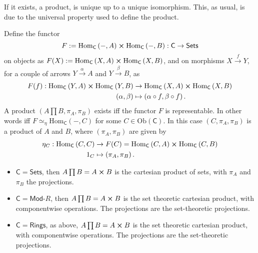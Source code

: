 \begin{rem}
	If it exists, a product, is unique up to a unique isomorphism.
	This, as usual, is due to the universal property used to define the product.
\end{rem}

\begin{prop}
	Define the functor 
	\begin{equation}
	F := \mathrm{Hom}_{\mathsf{C}} \left( -, A \right) \cross \mathrm{Hom}_{\mathsf{C}} \left( -, B \right): \mathsf{C} \to \mathsf{Sets}
	\end{equation} 
	on objects as $F(X) := \mathrm{Hom}_{\mathsf{C}} \left( X, A \right) \cross \mathrm{Hom}_{\mathsf{C}} \left( X, B \right)$, and on morphisms $X \xrightarrow{f} Y$, for a couple of arrows $Y \xrightarrow{\alpha} A$ and $Y \xrightarrow{\beta} B$, as
	\begin{align}
		F(f): \mathrm{Hom}_{\mathsf{C}} \left( Y, A \right) \cross \mathrm{Hom}_{\mathsf{C}} \left( Y, B \right) &\to \mathrm{Hom}_{\mathsf{C}} \left( X, A \right) \cross \mathrm{Hom}_{\mathsf{C}} \left( X, B \right) \\
		\left(\alpha, \beta\right) &\mapsto \left(\alpha \circ f, \beta \circ f \right)
	.\end{align} 
	A product $\left(A \prod B, \pi_A, \pi_B \right)$ exists iff the functor $F$ is representable.
	In other words iff $F \simeq_\eta \mathrm{Hom}_{\mathsf{C}} \left( -, C \right)$ for some $C \in \mathrm{Ob} \left(\mathsf{C}\right)$.
	In this case $\left(C, \pi_A, \pi_B\right)$ is a product of $A$ and $B$, where $\left(\pi_A, \pi_B\right)$ are given by
	\begin{align}
		\eta_C: \mathrm{Hom}_{\mathsf{C}} \left( C, C \right) &\to F(C) = \mathrm{Hom}_{\mathsf{C}} \left( C, A \right) \cross \mathrm{Hom}_{\mathsf{C}} \left( C, B \right)  \\
		1_C &\mapsto \left(\pi_A, \pi_B\right)
	.\end{align} 
\end{prop} 

\begin{ex}\leavevmode\vspace{-.2\baselineskip}
	\begin{itemize}
		\item $\mathsf{C} = \mathsf{Sets}$, then $A \prod B = A \cross B$ is the cartesian product of sets, with $\pi_A$ and $\pi_B$ the projections.
		\item $\mathsf{C} = \mathsf{Mod}\text{-}R$, then $A \prod B = A \cross B$ is the set theoretic cartesian product, with componentwise operations. The projections are the set-theoretic projections.
		\item $\mathsf{C} = \mathsf{Rings}$, as above, $A \prod B = A \cross B$ is the set theoretic cartesian product, with componentwise operations. The projections are the set-theoretic projections.
	\end{itemize}
\end{ex} 

